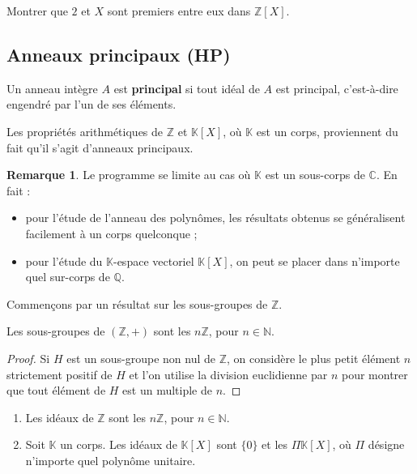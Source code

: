 \documentclass[french]{article}
\newcommand{\N}{\mathbb{N}}
\newcommand{\Z}{\mathbb{Z}}
\newcommand{\Q}{\mathbb{Q}}
\newcommand{\C}{\mathbb{C}}
\newcommand{\K}{\mathbb{K}}
\theoremstyle{plain}
\theoremstyle{definition}
\newtheorem*{rmq}{Remarque}
\theoremstyle{remark}
\begin{document}
\begin{exo}
	Montrer que $2$ et $X$ sont premiers entre eux dans $\Z[X]$.
\end{exo}

\subsection{Anneaux principaux (HP)}

\begin{dfn}
	Un anneau intègre $A$ est \textbf{principal} si tout idéal de $A$ est principal, c'est-à-dire engendré par l'un de ses éléments.
\end{dfn}

Les propriétés arithmétiques de $\Z$ et $\K[X]$, où $\K$ est un corps, proviennent du fait qu'il s'agit d'anneaux principaux.

\begin{rmq}
	Le programme se limite au cas où $\K$ est un sous-corps de $\C$. En fait :
	\begin{itemize}
		\item pour l'étude de l'anneau des polynômes, les résultats obtenus se généralisent facilement à un corps quelconque ;
		\item pour l'étude du $\K$-espace vectoriel $\K[X]$, on peut se placer dans n'importe quel sur-corps de $\Q$.
	\end{itemize}
\end{rmq}

Commençons par un résultat sur les sous-groupes de $\Z$.

\begin{prop}%
	Les sous-groupes de $(\Z,+)$ sont les $n\Z$, pour $n\in\N$.
\end{prop}
\begin{proof}
	Si $H$ est un sous-groupe non nul de $\Z$, on considère le plus petit élément $n$ strictement positif de $H$ et l'on utilise la division euclidienne par $n$ pour montrer que tout élément de $H$ est un multiple de $n$.
\end{proof}

\begin{prop}%
	\begin{enumerate}
		\item Les idéaux de $\Z$ sont les $n\Z$, pour $n\in\N$.
		\item Soit $\K$ un corps. Les idéaux de $\K[X]$ sont $\{0\}$ et les $\Pi\K[X]$, où $\Pi$ désigne n'importe quel polynôme unitaire.
	\end{enumerate}
\end{prop}
\end{document}

